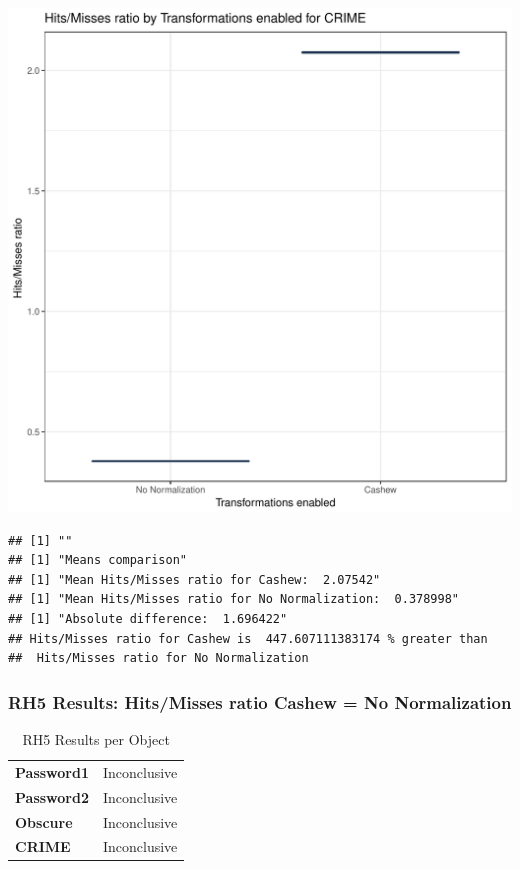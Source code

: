 \documentclass{article}\usepackage[]{graphicx}\usepackage[]{color}
\makeatletter
\def\maxwidth{ %
  \ifdim\Gin@nat@width>\linewidth
    \linewidth
  \else
    \Gin@nat@width
  \fi
}
\newenvironment{kframe}{%
 \def\at@end@of@kframe{}%
 \ifinner\ifhmode%
  \def\at@end@of@kframe{\end{minipage}}%
  \begin{minipage}{\columnwidth}%
 \fi\fi%
 \def\FrameCommand##1{\hskip\@totalleftmargin \hskip-\fboxsep
 \colorbox{shadecolor}{##1}\hskip-\fboxsep
     \hskip-\linewidth \hskip-\@totalleftmargin \hskip\columnwidth}%
 \MakeFramed {\advance\hsize-\width
   \@totalleftmargin\z@ \linewidth\hsize
   \@setminipage}}%
 {\par\unskip\endMakeFramed%
 \at@end@of@kframe}
\newenvironment{knitrout}{}{} %
\makeatother
\begin{document}
\begin{knitrout}
\color{fgcolor}
\includegraphics[width=\maxwidth]{figure/RH5_crime-1} 
\begin{kframe}

{\ttfamily\noindent\bfseries\color{errorcolor}{\#\# Error in eval(expr, envir, enclos): object 'shap\_cashew\_crime' not found}}\begin{verbatim}
## [1] ""
## [1] "Means comparison"
## [1] "Mean Hits/Misses ratio for Cashew:  2.07542"
## [1] "Mean Hits/Misses ratio for No Normalization:  0.378998"
## [1] "Absolute difference:  1.696422"
## Hits/Misses ratio for Cashew is  447.607111383174 % greater than 
##  Hits/Misses ratio for No Normalization
\end{verbatim}
\end{kframe}
\end{knitrout}


 

	
	\subsubsection{RH5 Results: Hits/Misses ratio Cashew = No Normalization}
	
	
	\begin{table}[H]
	\centering
	\caption{RH5 Results per Object}
	\begin{tabular}{ll}
	\textbf{Password1} & Inconclusive \\
	\textbf{Password2} & Inconclusive \\
	\textbf{Obscure} & Inconclusive \\
	\textbf{CRIME} & Inconclusive \\
	\end{tabular}
	\end{table}
\end{document}
